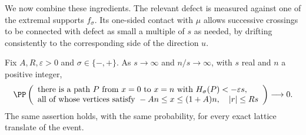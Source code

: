 We now combine these ingredients. The relevant defect is measured against
one of the extremal supports $f_\sigma$. Its one-sided contact with $\mu$
allows successive crossings to be connected with defect as small a multiple
of $s$ as needed, by drifting consistently to the corresponding side of
the direction $u$.

\begin{lemma}\label{df:cr:rare-fast}
Fix $A,R,\varepsilon>0$ and $\sigma\in\{-,+\}$. As $s\to\infty$ and
$n/s\to\infty$, with $s$ real and $n$ a positive integer,
\begin{equation}\label{df:eq:cr-rare-fast}
 \PP\left(
 \begin{array}{l}
 \text{there is a path $P$ from $x=0$ to $x=n$ with}
       \ H_\sigma(P)<-\varepsilon s,\\
 \text{all of whose vertices satisfy }
       -An\le x\le(1+A)n,\quad |r|\le Rs
 \end{array}\right)\longrightarrow0.
\end{equation}
The same assertion holds, with the same probability, for every exact
lattice translate of the event.
\end{lemma}

